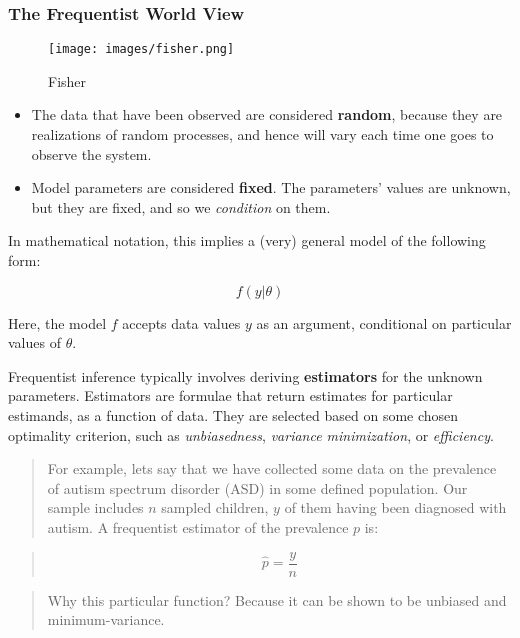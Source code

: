 \documentclass[11pt]{article}
\makeatletter
\def\maxwidth{\ifdim\Gin@nat@width>\linewidth\linewidth
    \else\Gin@nat@width\fi}
\let\Oldincludegraphics\includegraphics
\renewcommand{\includegraphics}[1]{\Oldincludegraphics[width=.8\maxwidth]{#1}}
\providecommand{\tightlist}{%
      \setlength{\itemsep}{0pt}\setlength{\parskip}{0pt}}
\makeatother
\begin{document}
    \hypertarget{the-frequentist-world-view}{%
\subsubsection{The Frequentist World
View}\label{the-frequentist-world-view}}

\begin{figure}
\centering
\texttt{[image: images/fisher.png]}
\caption{Fisher}
\end{figure}

\begin{itemize}
\tightlist
\item
  The data that have been observed are considered \textbf{random},
  because they are realizations of random processes, and hence will vary
  each time one goes to observe the system.
\item
  Model parameters are considered \textbf{fixed}. The parameters' values
  are unknown, but they are fixed, and so we \emph{condition} on them.
\end{itemize}

In mathematical notation, this implies a (very) general model of the
following form:

\[f(y | \theta)\]

Here, the model \(f\) accepts data values \(y\) as an argument,
conditional on particular values of \(\theta\).

Frequentist inference typically involves deriving \textbf{estimators}
for the unknown parameters. Estimators are formulae that return
estimates for particular estimands, as a function of data. They are
selected based on some chosen optimality criterion, such as
\emph{unbiasedness}, \emph{variance minimization}, or \emph{efficiency}.

\begin{quote}
For example, lets say that we have collected some data on the prevalence
of autism spectrum disorder (ASD) in some defined population. Our sample
includes \(n\) sampled children, \(y\) of them having been diagnosed
with autism. A frequentist estimator of the prevalence \(p\) is:
\end{quote}

\begin{quote}
\[\hat{p} = \frac{y}{n}\]
\end{quote}

\begin{quote}
Why this particular function? Because it can be shown to be unbiased and
minimum-variance.
\end{quote}
\end{document}
